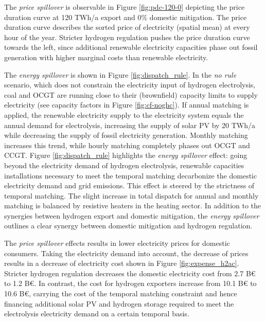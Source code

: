 The \textit{price spillover} is observable in Figure \ref{fig:pdc-120-0} depicting the price duration curve at 120 TWh/a export and 0\% domestic mitigation. The price duration curve describes the sorted price of electricity (spatial mean) at every hour of the year.
Stricter hydrogen regulation pushes the price duration curve towards the left, since additional renewable electricity capacities phase out fossil generation with higher marginal costs than renewable electricity.


The \textit{energy spillover} is shown in Figure \ref{fig:dispatch_rule}. In the \textit{no rule} scenario, which does not constrain the electricity input of hydrogen electrolysis, coal and OCGT are running close to their (brownfield) capacity limits to supply electricity (see capacity factors in Figure \ref{fig:cf-noghc}). If annual matching is applied, the renewable electricity supply to the electricity system equals the annual demand for electrolysis, increasing the supply of solar PV by 20 TWh/a while decreasing the supply of fossil electricity generation. 
Monthly matching increases this trend, while hourly matching completely phases out OCGT and CCGT. Figure \ref{fig:dispatch_rule} highlights the \textit{energy spillover} effect: going beyond the electricity demand of hydrogen electrolysis, renewable capacities installations necessary to meet the temporal matching decarbonize the domestic electricity demand and grid emissions. This effect is steered by the strictness of temporal matching. The slight increase in total dispatch for annual and monthly matching is balanced by resistive heaters in the heating sector.
In addition to the synergies between hydrogen export and domestic mitigation, the \textit{energy spillover} outlines a clear synergy between domestic mitigation and hydrogen regulation.



The \textit{price spillover} effects results in lower electricity prices for domestic consumers. Taking the electricity demand into account, the decrease of prices results in a decrease of electricity cost shown in 
Figure \ref{fig:expense_h2ac}. Stricter hydrogen regulation decreases the domestic electricity cost from 2.7 B€ to 1.2 B€. In contrast, the cost for hydrogen exporters increase from 10.1 B€ to 10.6 B€, carrying the cost of the temporal matching constraint and hence financing additional solar PV and hydrogen storage required to meet the electrolysis electricity demand on a certain temporal basis.

